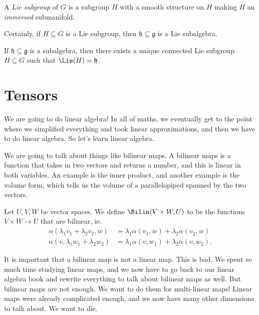 \documentclass[a4paper]{article}
\begin{document}
\begin{defi}
  A \emph{Lie subgroup} of $G$ is a subgroup $H$ with a smooth structure on $H$ making $H$ an \emph{immersed} submanifold.
\end{defi}

Certainly, if $H \subseteq G$ is a Lie subgroup, then $\mathfrak{h} \subseteq \mathfrak{g}$ is a Lie subalgebra.

\begin{thm}
  If $\mathfrak{h} \subseteq \mathfrak{g}$ is a subalgebra, then there exists a unique connected Lie subgroup $H \subseteq G$ such that $\Lie(H) = \mathfrak{h}$.
\end{thm}

\section{Tensors}
We are going to do linear algebra! In all of maths, we eventually get to the point where we simplified everything and took linear approximations, and then we have to do linear algebra. So let's learn linear algebra.

We are going to talk about things like bilinear maps. A bilinear maps is a function that takes in two vectors and returns a number, and this is linear in both variables. An example is the inner product, and another example is the volume form, which tells us the volume of a parallelopiped spanned by the two vectors.

\begin{defi}
  Let $U, V, W$ be vector spaces. We define $\Bilin(V\times W, U)$ to be the functions $V \times W \to U$ that are bilinear, ie.
  \begin{align*}
    \alpha(\lambda_1 v_1 + \lambda_2 v_2, w) &= \lambda_1 \alpha(v_1, w) + \lambda_2 \alpha(v_2, w)\\
    \alpha(v, \lambda_1 w_1 + \lambda_2 w_2) &= \lambda_1 \alpha(v, w_1) + \lambda_2 \alpha(v, w_2).
  \end{align*}
\end{defi}
It is important that a bilinear map is not a linear map. This is bad. We spent so much time studying linear maps, and we now have to go back to our linear algebra book and rewrite everything to talk about bilinear maps as well. But bilinear maps are not enough. We want to do them for multi-linear maps! Linear maps were already complicated enough, and we now have many other dimensions to talk about. We want to die.
\end{document}
